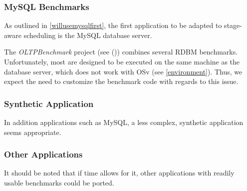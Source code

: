 \documentclass{article}
\begin{document}
\subsubsection{MySQL Benchmarks}

As outlined in \ref{willusemysqlfirst}, the first application to be adapted to stage-aware scheduling is the MySQL database server.

The \textit{OLTPBenchmark} project (see (\cite{oltpbench})) combines several RDBM benchmarks.
Unfortunately, most are designed to be executed on the same machine as the database server, which does not work with OSv (see \ref{environment}).
Thus, we expect the need to customize the benchmark code with regards to this issue.

\subsubsection{Synthetic Application}

In addition applications such as MySQL, a less complex, synthetic application seems appropriate.

\subsubsection{Other Applications}

It should be noted that if time allows for it, other applications with readily usable benchmarks could be ported.

\clearpage

\printglossaries

\clearpage


\end{document}
